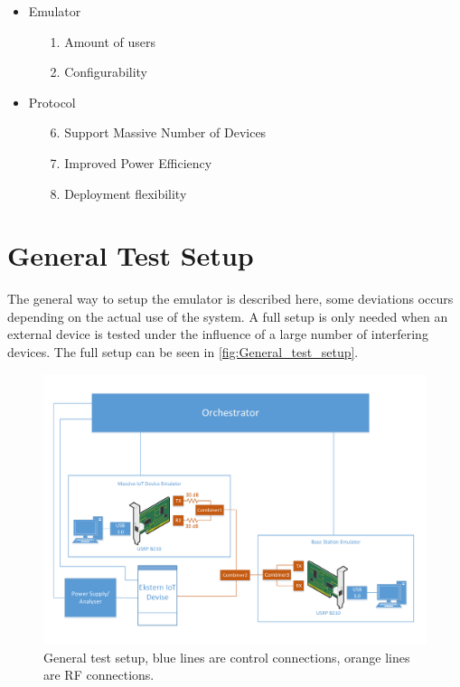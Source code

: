 \begin{itemize}
\item Emulator
	\begin{enumerate}
	\item[1.] Amount of users %
	\item[2.] Configurability %
	\end{enumerate}
\item Protocol
	\begin{enumerate}
	\item[6.] Support Massive Number of Devices 
	\item[7.] Improved Power Efficiency
	\item[8.] Deployment flexibility
	\end{enumerate}
\end{itemize}

\newpage

\section{General Test Setup}

The general way to setup the emulator is described here, some deviations occurs depending on the actual use of the system. A full setup is only needed when an external device is tested under the influence of a large number of interfering devices. The full setup can be seen in \autoref{fig:General_test_setup}.

\begin{figure}[H]
\centering
\includegraphics[width=\textwidth]{figures/General_test_setup.pdf}
\caption{General test setup, blue lines are control connections, orange lines are RF connections.}
\label{fig:General_test_setup}
\end{figure}

